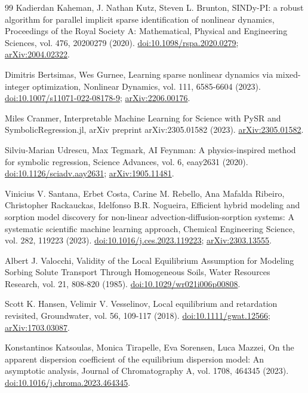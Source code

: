\documentclass[11pt]{article}
\begin{document}
\begin{thebibliography}{99}
 Kadierdan Kaheman, J. Nathan Kutz, Steven L. Brunton, SINDy-PI: a robust algorithm for parallel implicit sparse identification of nonlinear dynamics, Proceedings of the Royal Society A: Mathematical, Physical and Engineering Sciences, vol. 476, 20200279 (2020). \href{https://doi.org/10.1098/rspa.2020.0279}{doi:10.1098/rspa.2020.0279}; \href{https://arxiv.org/abs/2004.02322}{arXiv:2004.02322}.

 Dimitris Bertsimas, Wes Gurnee, Learning sparse nonlinear dynamics via mixed-integer optimization, Nonlinear Dynamics, vol. 111, 6585-6604 (2023). \href{https://doi.org/10.1007/s11071-022-08178-9}{doi:10.1007/s11071-022-08178-9}; \href{https://arxiv.org/abs/2206.00176}{arXiv:2206.00176}.

 Miles Cranmer, Interpretable Machine Learning for Science with PySR and SymbolicRegression.jl, arXiv preprint arXiv:2305.01582 (2023). \href{https://arxiv.org/abs/2305.01582}{arXiv:2305.01582}.

 Silviu-Marian Udrescu, Max Tegmark, AI Feynman: A physics-inspired method for symbolic regression, Science Advances, vol. 6, eaay2631 (2020). \href{https://doi.org/10.1126/sciadv.aay2631}{doi:10.1126/sciadv.aay2631}; \href{https://arxiv.org/abs/1905.11481}{arXiv:1905.11481}.

 Vinicius V. Santana, Erbet Costa, Carine M. Rebello, Ana Mafalda Ribeiro, Christopher Rackauckas, Idelfonso B.R. Nogueira, Efficient hybrid modeling and sorption model discovery for non-linear advection-diffusion-sorption systems: A systematic scientific machine learning approach, Chemical Engineering Science, vol. 282, 119223 (2023). \href{https://doi.org/10.1016/j.ces.2023.119223}{doi:10.1016/j.ces.2023.119223}; \href{https://arxiv.org/abs/2303.13555}{arXiv:2303.13555}.

 Albert J. Valocchi, Validity of the Local Equilibrium Assumption for Modeling Sorbing Solute Transport Through Homogeneous Soils, Water Resources Research, vol. 21, 808-820 (1985). \href{https://doi.org/10.1029/wr021i006p00808}{doi:10.1029/wr021i006p00808}.

 Scott K. Hansen, Velimir V. Vesselinov, Local equilibrium and retardation revisited, Groundwater, vol. 56, 109-117 (2018). \href{https://doi.org/10.1111/gwat.12566}{doi:10.1111/gwat.12566}; \href{https://arxiv.org/abs/1703.03087}{arXiv:1703.03087}.

 Konstantinos Katsoulas, Monica Tirapelle, Eva Sorensen, Luca Mazzei, On the apparent dispersion coefficient of the equilibrium dispersion model: An asymptotic analysis, Journal of Chromatography A, vol. 1708, 464345 (2023). \href{https://doi.org/10.1016/j.chroma.2023.464345}{doi:10.1016/j.chroma.2023.464345}.


\end{thebibliography}
\end{document}
